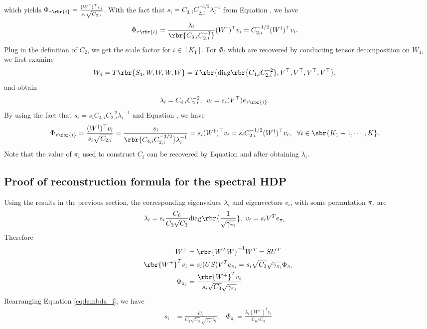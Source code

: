 \documentclass[twoside,11pt]{article}
\begin{document}
{\begin{align}
  \end{align}
which yields $\Phi_{\tau \rbr{i}} =  \frac{(W^{\dag})^\top v_i }{s_i \sqrt{C_{2,i}}}$. With the fact that $s_i = C_{3,i}C_{2,i}^{-3/2} \lambda_i^{-1}$ from Equation , we have
  \begin{align}
    \Phi_{\tau \rbr{i}} &=  \frac{\lambda_i }{\rbr{ C_{3,i}C_{2,i}^{-1}}}  (W^{\dag})^\top v_i = C_{2,i}^{-1/2} (W^{\dag})^\top v_i .
  \end{align}
Plug in the definition of $C_2$, we get the scale factor for $i \in [K_1]$. For $\Phi_i$ which are recovered by conducting tensor decomposition on $W_4$, we first examine
  \begin{align}
    W_4 = T \rbr{S_4, W,W,W,W} &=T\rbr{\mathrm{diag} \rbr{C_{4,i} C_{2,i}^{-2}}, V^\top ,V^\top ,V^\top ,V^\top},
  \end{align}
and obtain
  \begin{align}
    \label{eq:lambda-s4}
    \lambda_i & =  C_{4,i} C_{2,i}^{-2},\,\,\, v_i = s_i (V^\top ) e_{\tau \rbr{i}}.
  \end{align}
By using the fact that $s_i = s_i C_{4,i} C_{2,i}^{-2} {\lambda_i}^{-1}$ and Equation , we have
  \begin{align}
    \Phi_{\tau \rbr{i}}& =  \frac{(W^{\dag})^\top v_i }{s_i \sqrt{C_{2,i}}}= \frac{s_i }{\rbr{C_{4,i} C_{2,i}^{-3/2}} \lambda_i^{-1} } = s_i (W^{\dag})^\top  v_i =s_i  C_{2,i}^{-1/2} (W^{\dag})^\top v_i , \,\,\,\, \forall i \in \sbr{K_1+1, \cdots, K}.
  \end{align}
   Note that the value of $\pi_i$ used to construct $C_j$ can be recovered by Equation  and  after obtaining $\lambda_i$.

\subsection{ Proof of reconstruction formula for the spectral HDP}

\label{proof:reconstruction2}
Using the results in the previous section, the corresponding eigenvalues $\lambda_i$ and eigenvectors $v_i$, with some permutation ${\bf \pi}$, are
\begin{align}
\lambda_i &= s_i \frac{C_6}{C_3\sqrt{C_3}}\mathrm{diag}\rbr{\frac{1}{\sqrt{\gamma_{\pi_i}}}}, \,\,v_i = s_iV^Te_{\pi_i}
\label{eq:lambda_i}
\end{align}
Therefore
\begin{align}
W^+ &= \rbr{W^TW}^{-1}W^T = SU^T\\
\rbr{W^+}^Tv_i &= s_i(US)V^Te_{\pi_i} = s_i \sqrt{C_3}\sqrt{\gamma_{\pi_i}}\Phi_{\pi_i}\\
\Phi_{\pi_i} &= \frac{\rbr{W^+}^Tv_i}{s_i \sqrt{C_3}\sqrt{\gamma_{\pi_i}}}
\end{align}
Rearranging Equation \ref{eq:lambda_i}, we have
\begin{align}
s_i &= \frac{C_6}{C_3\sqrt{C_3}\sqrt{\gamma_{\pi_i}}\lambda_i};\,\,\,\,\,\Phi_{\pi_i} = \frac{\lambda_i (W^+)^T v_i}{C_6/C_3}
\end{align}

}
\end{document}
